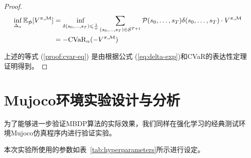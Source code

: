 \begin{proof}
\begin{align}
    \inf\limits_{\Delta_\alpha}\mathbb{E}_{\hat{\mathcal{P}}}[V^{\pi,\mathcal{M}}] &= \inf\limits_{\delta(s_0,\ldots,s_T)\leq\frac{1}{\alpha}}\sum_{(s_0,\ldots,s_T)\in\mathcal{S}^{T+1}}\mathcal{P}(s_0,\ldots,s_T)\delta(s_0,\ldots,s_T)\cdot V^{\pi,\mathcal{M}}\notag\\
    &=-\mathrm{CVaR}_\alpha(-V^{\pi,\mathcal{M}})\label{proof:cvar-eq}
\end{align}

上述的等式 (\ref{proof:cvar-eq}) 是由根据公式 (\ref{eq:delta-exp})和CVaR的表达性定理证明得到。

\end{proof}

\section{Mujoco环境实验设计与分析}

为了能够进一步验证MBDP算法的实际效果，我们同样在强化学习的经典测试环境Mujoco仿真程序内进行验证实验。

本次实验所使用的参数如表~\ref{tab:hyperparameters}所示进行设定。

